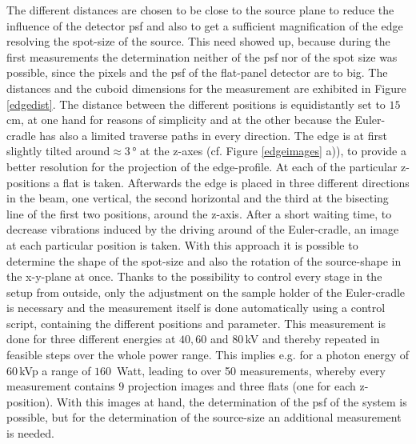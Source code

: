 The different distances are chosen to be close to the source plane to reduce the influence of the detector \gls{psf} and also to get a sufficient magnification of the edge resolving the spot-size of the source. This need showed up, because during the first measurements the determination neither of the \gls{psf} nor of the spot size was possible, since the pixels and the \acrshort{psf} of the flat-panel detector are to big. The distances and the cuboid dimensions for the measurement are exhibited in Figure \ref{edgedist}. The distance between the different positions is equidistantly set to $15\,$cm, at one hand for reasons of simplicity and at the other because the Euler-cradle has also a limited traverse paths in every direction. The edge is at first slightly tilted around$\approx 3\,$° at the z-axes (cf. Figure \ref{edgeimages} a)), to provide a better resolution for the projection of the edge-profile. At each of the particular z-positions a \gls{flat} is taken. Afterwards the edge is placed in three different directions in the beam, one vertical, the second horizontal and the third at the bisecting line of the first two positions, around the z-axis. After a short waiting time, to decrease vibrations induced by the driving around of the Euler-cradle, an image at each particular position is taken. With this approach it is possible to determine the shape of the spot-size and also the rotation of the source-shape in the x-y-plane at once. Thanks to the possibility to control every stage in the setup from outside, only the adjustment on the sample holder of the Euler-cradle is necessary and the measurement itself is done automatically using a control script, containing the different positions and parameter. This measurement is done for three different energies at $40,60$ and $80\,$kV and thereby repeated in feasible steps over the whole power range. This implies e.g. for a photon energy of $60\,$kVp a range of $160\,$ Watt, leading to over 50 measurements, whereby every measurement contains $9$ projection images and three \glspl{flat} (one for each z-position).  With this images at hand, the determination of the \gls{psf} of the system is possible, but for the determination of the source-size an additional measurement is needed.\\

